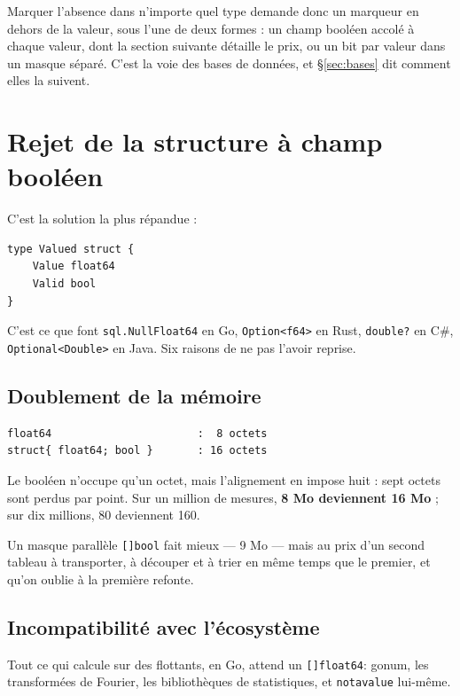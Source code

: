 \documentclass[11pt,a4paper]{report}
\begin{document}
Marquer l'absence dans n'importe quel type demande donc un marqueur en
dehors de la valeur, sous l'une de deux formes : un champ booléen accolé
à chaque valeur, dont la section suivante détaille le prix, ou un bit par
valeur dans un masque séparé. C'est la voie des bases de données, et
§\ref{sec:bases} dit comment elles la suivent.

\section{Rejet de la structure à champ booléen}\label{sec:struct}

C'est la solution la plus répandue :

\begin{verbatim}
type Valued struct {
    Value float64
    Valid bool
}
\end{verbatim}

C'est ce que font \texttt{sql.NullFloat64} en Go,
\texttt{Option\textless{}f64\textgreater{}} en Rust, \texttt{double?} en
C\#, \texttt{Optional\textless{}Double\textgreater{}} en Java. Six
raisons de ne pas l'avoir reprise.

\subsection{Doublement de la mémoire}

\begin{verbatim}
float64                       :  8 octets
struct{ float64; bool }       : 16 octets
\end{verbatim}

Le booléen n'occupe qu'un octet, mais l'alignement en impose huit : sept
octets sont perdus par point. Sur un million de mesures, \textbf{8 Mo
deviennent 16 Mo} ; sur dix millions, 80 deviennent 160.

Un masque parallèle \texttt{[]bool} fait mieux --- 9 Mo --- mais au
prix d'un second tableau à transporter, à découper et à trier en même
temps que le premier, et qu'on oublie à la première refonte.

\subsection{Incompatibilité avec l'écosystème}

Tout ce qui calcule sur des flottants, en Go, attend un
\texttt{[]float64}: gonum, les transformées de Fourier, les
bibliothèques de statistiques, et \texttt{notavalue} lui-même.
\end{document}
